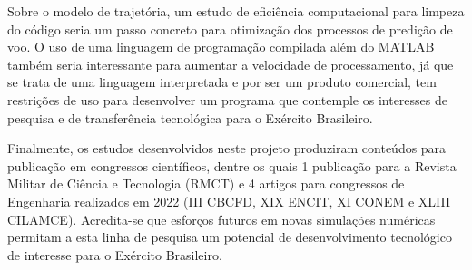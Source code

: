 Sobre o modelo de trajetória, um estudo de eficiência computacional para limpeza do código seria um passo concreto para otimização dos processos de predição de voo. O uso de uma linguagem de programação compilada além do MATLAB\textregistered{} também seria interessante para aumentar a velocidade de processamento, já que se trata de uma linguagem interpretada e por ser um produto comercial, tem restrições de uso para desenvolver um programa que contemple os interesses de pesquisa e de transferência tecnológica para o Exército Brasileiro.

Finalmente, os estudos desenvolvidos neste projeto produziram conteúdos para publicação em congressos científicos, dentre os quais 1 publicação para a Revista Militar de Ciência e Tecnologia (RMCT) e 4 artigos para congressos de Engenharia realizados em 2022 (III CBCFD, XIX ENCIT, XI CONEM e XLIII CILAMCE). Acredita-se que esforços futuros em novas simulações numéricas permitam a esta linha de pesquisa um potencial de desenvolvimento tecnológico de interesse para o Exército Brasileiro. 